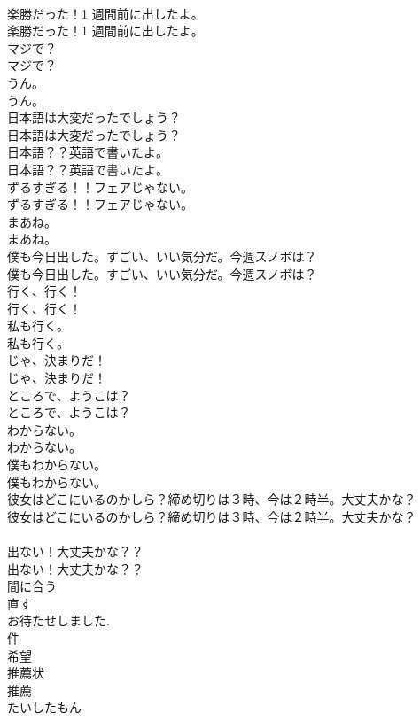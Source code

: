 \documentclass[8pt]{extreport}
\begin{document}
\begin{CJK}{UTF8}{min}
\\	楽勝だった！1 週間前に出したよ。	
\\	楽勝だった！1 週間前に出したよ。 
\\	マジで？	
\\	マジで？ 
\\	うん。	
\\	うん。 
\\	日本語は大変だったでしょう？	
\\	日本語は大変だったでしょう？ 
\\	日本語？？英語で書いたよ。	
\\	日本語？？英語で書いたよ。 
\\	ずるすぎる！！フェアじゃない。	
\\	ずるすぎる！！フェアじゃない。 
\\	まあね。	
\\	まあね。 
\\	僕も今日出した。すごい、いい気分だ。今週スノボは？	
\\	僕も今日出した。すごい、いい気分だ。今週スノボは？ 
\\	行く、行く！	
\\	行く、行く！ 
\\	私も行く。	
\\	私も行く。 
\\	じゃ、決まりだ！	
\\	じゃ、決まりだ！ 
\\	ところで、ようこは？	
\\	ところで、ようこは？ 
\\	わからない。	
\\	わからない。 
\\	僕もわからない。	
\\	僕もわからない。 
\\	彼女はどこにいるのかしら？締め切りは３時、今は２時半。大丈夫かな？	
\\	彼女はどこにいるのかしら？締め切りは３時、今は２時半。大丈夫かな？ 
\\	[電話をかける・・・]	
\\	出ない！大丈夫かな？？	
\\	出ない！大丈夫かな？？ 
\\	間に合う
\\	直す
\\	お待たせしました.
\\	件
\\	希望
\\	推薦状
\\	推薦
\\	たいしたもん

\end{CJK}
\end{document}

